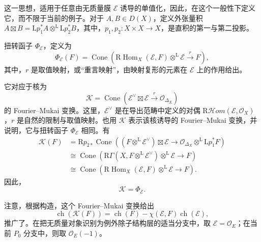 这一思想，适用于任意由无质量膜 $\mathcal{E}$ 诱导的单值化，因此，在这个一般性下定义它，而不限于当前的例子。对于 $A,B\in D(X)$，定义外张量积 $A\boxtimes B=\mathrm{L}p_1^*A\otimes^{\mathrm{L}}\mathrm{L}p_2^*B$，其中，$p_1,p_2\colon X\times X\to X$，是直积的第一与第二投影。
\begin{definition}\label{def:5.33}
扭转函子 $\Phi_{\mathcal{E}}$，定义为
\begin{equation}\label{eq:5.176}
\Phi_{\mathcal{E}}(F)=\operatorname{Cone}\!\left(
\mathrm{R}\operatorname{Hom}_X(\mathcal{E},F)
\otimes^{\mathrm{L}}\mathcal{E}\xrightarrow{r}F\right),
\end{equation}
其中，$r$ 是取值映射，或“重言映射”，由映射复形的元素在 $\mathcal{E}$ 上的作用给出。
\end{definition}

它对应于核为
\begin{equation}\label{eq:5.177}
\mathcal{K}=\operatorname{Cone}\!\left(
\mathcal{E}^{\vee}\boxtimes\mathcal{E}\xrightarrow{r}
\mathcal{O}_{\Delta_X}\right)
\end{equation}
的 Fourier--Mukai 变换。这里，$\mathcal{E}^{\vee}$ 是在导出范畴中定义的对偶 $\mathrm{R}\mathcal{H}\!om(\mathcal{E},\mathcal{O}_X)$，$r$ 是自然的限制与取值映射。也用 $\mathcal{K}$ 表示该核诱导的 Fourier--Mukai 变换，并说明，它与扭转函子 $\Phi_{\mathcal{E}}$ 相同。有
\[
\begin{aligned}
\mathcal{K}(F)
&=\mathrm{R}p_{2*}\operatorname{Cone}\!\left(
(F\otimes^{\mathrm{L}}\mathcal{E}^{\vee})\boxtimes\mathcal{E}
\to\mathcal{O}_{\Delta_X}\otimes^{\mathrm{L}}\mathrm{L}p_1^*F\right)\\
&\cong\operatorname{Cone}\!\left(
\mathrm{R}\Gamma(X,F\otimes^{\mathrm{L}}\mathcal{E}^{\vee})
\otimes^{\mathrm{L}}\mathcal{E}\to F\right)\\
&\cong\operatorname{Cone}\!\left(
\mathrm{R}\operatorname{Hom}_X(\mathcal{E},F)
\otimes^{\mathrm{L}}\mathcal{E}\to F\right).
\end{aligned}
\]
因此，
\begin{equation}\label{eq:5.178}
\mathcal{K}=\Phi_{\mathcal{E}}.
\end{equation}

注意，根据构造，这个 Fourier--Mukai 变换给出
\[
\operatorname{ch}(\mathcal{K}(F))
=\operatorname{ch}(F)-\chi(\mathcal{E},F)\operatorname{ch}(\mathcal{E}),
\]
推广了。在把无质量对象识别为例外除子结构层的适当分支中，取 $\mathcal{E}=\mathcal{O}_E$；在当前 $P_0$ 分支中，则取 $\mathcal{O}_E(-1)$。

